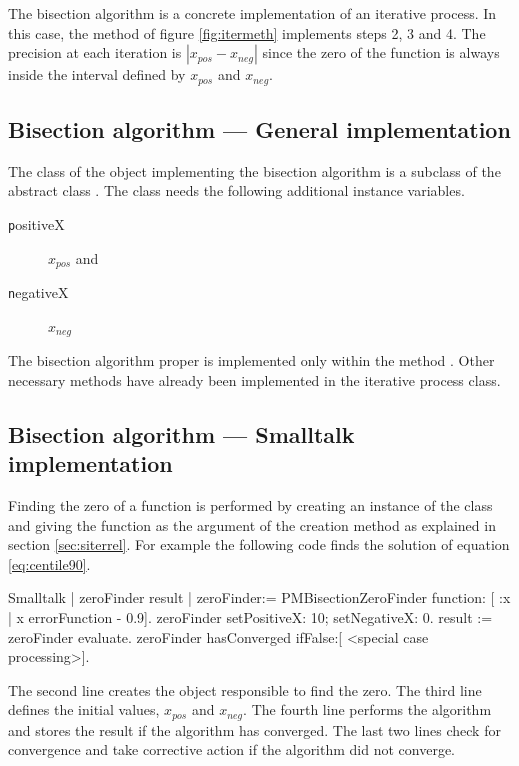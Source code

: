 The bisection algorithm is a concrete implementation of an
iterative process. In this case, the method  of figure \ref{fig:itermeth} implements steps
2, 3 and 4. The precision at each iteration is $\left|
x_{pos}-x_{neg}\right|$ since the zero
of the function is always inside the interval defined by
$x_{pos}$ and $x_{neg}$.

\subsection{Bisection algorithm --- General  implementation}

The class of the object implementing the bisection algorithm is a
subclass of the abstract class .
The class  needs the following additional instance variables.
\begin{description}
  \item[\texttt positiveX]$x_{pos}$ and
  \item [\texttt negativeX]$x_{neg}$
\end{description}
The bisection algorithm proper is implemented only within the
method .
Other necessary methods have already been implemented in the iterative process class.

\subsection{Bisection algorithm --- Smalltalk  implementation}
Finding the zero of a function is performed by creating an
instance of the class  and giving the
function as the argument of the creation method as explained in
section \ref{sec:siterrel}. For example the following code finds
the solution of equation \ref{eq:centile90}.
\begin{displaycode}{Smalltalk}
| zeroFinder result |
zeroFinder:= PMBisectionZeroFinder function: [ :x | x errorFunction - 0.9].
zeroFinder setPositiveX: 10; setNegativeX: 0.
result := zeroFinder evaluate. zeroFinder
hasConverged
   ifFalse:[ <special case processing>].
\end{displaycode}
The second line creates the object responsible to find the zero.
The third line defines the initial values, $x_{pos}$ and $x_{neg}$.
The fourth line performs the algorithm and stores the result if the algorithm has converged.
The last two lines check for convergence and take corrective action if the algorithm did not converge.


